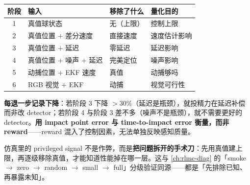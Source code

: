 \begin{center}
\small
\begin{tabular}{@{}clll@{}}
\toprule
阶段 & 输入 & 移除了什么 & 量化目的 \\
\midrule
1 & 真值球状态 & 无（上限） & 控制上限 \\
2 & 真值位置 $+$ 差分速度 & 直接速度 & 速度估计影响 \\
3 & 真值位置 $+$ 延迟 & 零延迟 & 延迟影响 \\
4 & 真值位置 $+$ 噪声 $+$ 延迟 & 完美定位 & 噪声影响 \\
5 & 动捕位置 $+$ EKF 速度 & 真值 & 动捕够吗 \\
6 & RGB 视觉 $+$ EKF & 动捕 & 视觉可行性 \\
\bottomrule
\end{tabular}
\end{center}

\textbf{每退一步记录下降}：若阶段 3 下降 $>30\%$（延迟是瓶颈），就投精力在延迟补偿而非改 detector；若阶段 4 与阶段 3 差不多（噪声不是瓶颈），就不需要更好的 detector。\textbf{用 impact point error 与 time-to-impact error 衡量，而非 reward}——reward 混入了控制因素，无法单独反映感知质量。

\begin{insight}\label{ins:rlmc-perc-ladder}
仿真里的 privileged signal 不是作弊，而是\textbf{把问题拆开的手术刀}：先用真值建上限，再逐级移除真值，才能知道性能掉在哪一层。这与 \cref{ch:rlmc-diag} 的「smoke $\to$ zero $\to$ random $\to$ small $\to$ full」分级验证同源——都是「先排除已知、再暴露未知」。
\end{insight}

